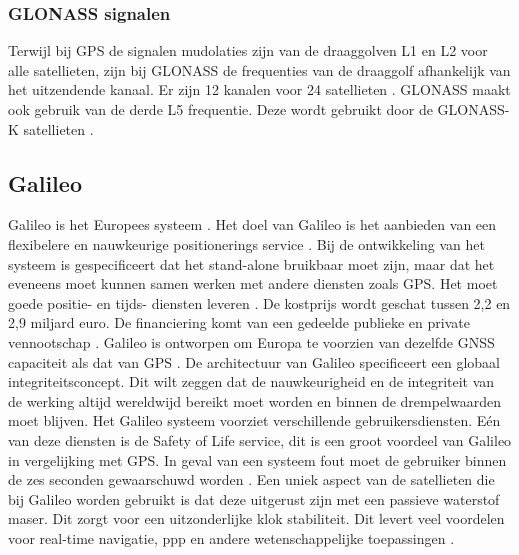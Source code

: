 \subsubsection{GLONASS signalen}
Terwijl bij GPS de signalen mudolaties zijn van de draaggolven L1 en L2 voor alle satellieten, zijn bij GLONASS de frequenties van de draaggolf afhankelijk van het uitzendende kanaal. Er zijn 12 kanalen voor 24 satellieten \cite{LBibGPS3}. GLONASS maakt ook gebruik van de derde L5 frequentie. Deze wordt gebruikt door de GLONASS-K satellieten \cite{LBibGNSS9}.  
 
\subsection{Galileo}
\label{LGal}
Galileo is het Europees systeem \cite{LBibGNSS3, LBibGNSS4}. Het doel van Galileo is het aanbieden van een flexibelere en nauwkeurige positionerings service \cite{LBibGNSS4}. Bij de ontwikkeling van het systeem is gespecificeert dat het stand-alone bruikbaar moet zijn, maar dat het eveneens moet kunnen samen werken met andere diensten zoals GPS. Het moet goede positie- en tijds- diensten leveren \cite{LBibGalileo2}. De kostprijs wordt geschat tussen 2,2 en 2,9 miljard euro. De financiering komt van een gedeelde publieke en private vennootschap \cite{LBibGNSS8}. Galileo is ontworpen om Europa te voorzien van dezelfde GNSS capaciteit als dat van GPS \cite{LBibGNSS6}. De architectuur van Galileo specificeert een globaal integriteitsconcept. Dit wilt zeggen dat de nauwkeurigheid en de integriteit van de werking altijd wereldwijd bereikt moet worden en binnen de drempelwaarden moet blijven.  Het Galileo systeem voorziet verschillende gebruikersdiensten. E\'en van deze diensten is de Safety of Life service, dit is een groot voordeel van Galileo in vergelijking met GPS. In geval van een systeem fout moet de gebruiker binnen de zes seconden gewaarschuwd worden \cite{LBibGalileo}. Een uniek aspect van de satellieten die bij Galileo worden gebruikt is dat deze uitgerust zijn met een passieve waterstof maser. Dit zorgt voor een uitzonderlijke klok stabiliteit. Dit levert veel voordelen voor real-time navigatie, ppp en andere wetenschappelijke toepassingen \cite{LBibGNSS9}.

